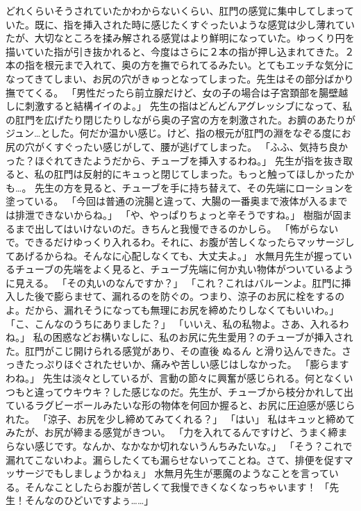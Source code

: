 どれくらいそうされていたかわからないくらい、肛門の感覚に集中してしまっていた。既に、指を挿入された時に感じたくすぐったいような感覚は少し薄れていたが、大切なところを揉み解される感覚はより鮮明になっていた。ゆっくり円を描いていた指が引き抜かれると、今度はさらに２本の指が押し込まれてきた。２本の指を根元まで入れて、奥の方を撫でられてるみたい。とてもエッチな気分になってきてしまい、お尻の穴がきゅっとなってしまった。先生はその部分ばかり撫でてくる。
「男性だったら前立腺だけど、女の子の場合は子宮頚部を腸壁越しに刺激すると結構イイのよ。」
先生の指はどんどんアグレッシブになって、私の肛門を広げたり閉じたりしながら奥の子宮の方を刺激された。お臍のあたりがジュン…とした。何だか温かい感じ。けど、指の根元が肛門の淵をなぞる度にお尻の穴がくすぐったい感じがして、腰が逃げてしまった。
「ふふ、気持ち良かった？ほぐれてきたようだから、チューブを挿入するわね。」
先生が指を抜き取ると、私の肛門は反射的にキュっと閉じてしまった。もっと触ってほしかったかも…。
先生の方を見ると、チューブを手に持ち替えて、その先端にローションを塗っている。
「今回は普通の浣腸と違って、大腸の一番奥まで液体が入るまでは排泄できないからね。」
「や、やっぱりちょっと辛そうですね。」
樹脂が固まるまで出してはいけないのだ。きちんと我慢できるのかしら。
「怖がらないで。できるだけゆっくり入れるわ。それに、お腹が苦しくなったらマッサージしてあげるからね。そんなに心配しなくても、大丈夫よ。」
水無月先生が握っているチューブの先端をよく見ると、チューブ先端に何か丸い物体がついているように見える。
「その丸いのなんですか？」
「これ？これはバルーンよ。肛門に挿入した後で膨らませて、漏れるのを防ぐの。つまり、涼子のお尻に栓をするのよ。だから、漏れそうになっても無理にお尻を締めたりしなくてもいいわ。」
「こ、こんなのうちにありました？」
「いいえ、私の私物よ。さあ、入れるわね。」
私の困惑などお構いなしに、私のお尻に先生愛用？のチューブが挿入された。肛門がこじ開けられる感覚があり、その直後 ぬるん と滑り込んできた。さっきたっぷりほぐされたせいか、痛みや苦しい感じはしなかった。
「膨らますわね。」
先生は淡々としているが、言動の節々に興奮が感じられる。何となくいつもと違ってウキウキ？した感じなのだ。先生が、チューブから枝分かれして出ているラグビーボールみたいな形の物体を何回か握ると、お尻に圧迫感が感じられた。
「涼子、お尻を少し締めてみてくれる？」
「はい」
私はキュッと締めてみたが、お尻が締まる感覚がきつい。
「力を入れてるんですけど、うまく締まらない感じです。なんか、なかなか切れないうんちみたいな。」
「そう？これで漏れてこないわよ。漏らしたくても漏らせないってことね。さて、排便を促すマッサージでもしましょうかねぇ」
水無月先生が悪魔のようなことを言っている。そんなことしたらお腹が苦しくて我慢できくなくなっちゃいます！
「先生！そんなのひどいですよぅ……」
